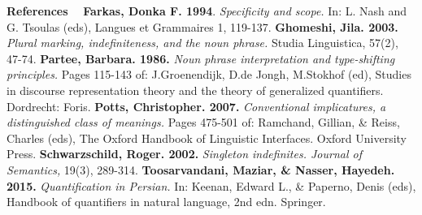 \documentclass [11pt] {article}
\begin{document}
\textbf{References} ~~{\scriptsize \textbf{Farkas, Donka F. 1994}. \textit{Specificity and scope.} In: L. Nash and G. Tsoulas (eds), Langues et Grammaires 1, 119-137. \textbf{Ghomeshi, Jila. 2003.} \textit{Plural marking, indefiniteness, and the noun phrase.} Studia Linguistica, 57(2), 47-74. \textbf{Partee, Barbara. 1986.} \textit{Noun phrase interpretation and type-shifting principles.} Pages 115-143 of: J.Groenendijk, D.de Jongh, M.Stokhof (ed), Studies in discourse representation theory and the theory of generalized quantifiers. Dordrecht: Foris. \textbf{Potts, Christopher. 2007.} \textit{Conventional implicatures, a distinguished class of meanings.} Pages 475-501 of: Ramchand, Gillian, \& Reiss, Charles (eds), The Oxford Handbook of Linguistic Interfaces. Oxford University Press. \textbf{Schwarzschild, Roger. 2002.} \textit{Singleton indefinites. Journal of Semantics,} 19(3), 289-314. \textbf{Toosarvandani, Maziar, \& Nasser, Hayedeh. 2015.} \textit{Quantification in Persian.} In: Keenan, Edward L., \& Paperno, Denis (eds), Handbook of quantifiers in natural language, 2nd edn. Springer. }

%
\end{document}
